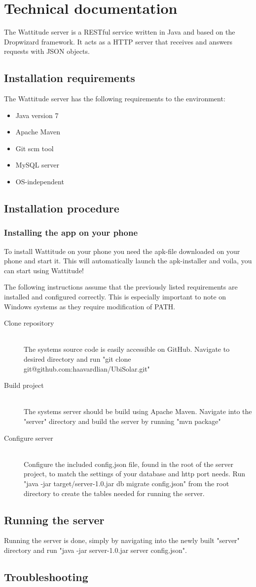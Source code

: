 \chapter{Technical documentation}
The Wattitude server is a RESTful service written in Java and based on the Dropwizard framework. It acts as a HTTP server that receives and answers requests with JSON objects. 
\section{Installation requirements}
The Wattitude server has the following requirements to the environment:
\begin{itemize}
\item Java version 7
\item Apache Maven 
\item Git scm tool
\item MySQL server
\item OS-independent
\end{itemize}
\section{Installation procedure}

\subsection{Installing the app on your phone}
\label{sec:installWattitudePhone}
To install Wattitude on your phone you need the apk-file downloaded on your phone and start it. This will automatically launch the apk-installer and voila, you can start using Wattitude!

The following instructions assume that the previously listed requirements are installed and configured correctly. This is especially important to note on Windows systems as they require modification of PATH.
\begin{description}
  \item[Clone repository] \hfill \\
  The systems source code is easily accessible on GitHub. Navigate to desired directory and run "git clone git@github.com:haavardlian/UbiSolar.git"
  \item[Build project] \hfill \\
  The systems server should be build using Apache Maven. Navigate into the "server" directory and build the server by running "mvn package"
  \item[Configure server] \hfill \\
  Configure the included config.json file, found in the root of the server project, to match the settings of your database and http port needs. Run "java -jar target/server-1.0.jar db migrate config.json" from the root directory to create the tables needed for running the server. 
  
\end{description}

\section{Running the server}
Running the server is done, simply by navigating into the newly built "server" directory and run "java -jar server-1.0.jar server config.json".

\section{Troubleshooting}